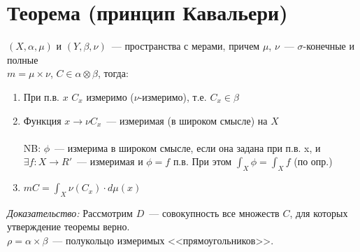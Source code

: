 \documentclass[paper=a4, fontsize=17pt]{article}
\begin{document}
\section{Теорема (принцип Кавальери)}
	$(X, \alpha, \mu)$ и $(Y, \beta, \nu)$~--- пространства с мерами, причем $\mu$, $\nu$~--- $\sigma$-конечные и полные\\
	$m = \mu \times \nu$, $C \in \alpha\otimes\beta$, тогда:\\
	\begin{enumerate}
		\item
		При п.в. $x$ $C_x$ измеримо ($\nu$-измеримо), т.е. $C_x \in \beta$
		\item
		Функция $x \rightarrow \nu C_x$~--- измеримая (в широком смысле) на $X$\\ \\
		NB: $\phi$~--- измерима в широком смысле, если она задана при п.в. x, и $\exists f : X \rightarrow R'$~--- измеримая и $\phi = f$ п.в. При этом $\int_X \phi = \int_X f$ (по опр.)
		\item
		$m C = \int_X \nu(C_x) \cdot d\mu(x)$
	\end{enumerate}
	\emph{Доказательство:}
		Рассмотрим $D$~--- совокупность все множеств $C$, для которых утверждение теоремы верно.\\
		$\rho = \alpha\times\beta$~--- полукольцо измеримых <<прямоугольников>>.\\
\end{document}

